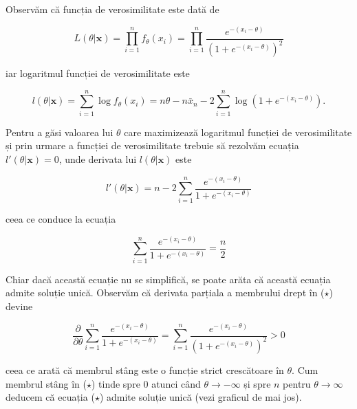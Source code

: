 \documentclass[
]{article}
\begin{document}
Observăm că funcția de verosimilitate este dată de

\[
L(\theta|\mathbf{x}) = \prod_{i=1}^{n}f_{\theta}(x_i) = \prod_{i=1}^{n}\frac{e^{-(x_i-\theta)}}{\left(1+e^{-(x_i-\theta)}\right)^2}
\]

iar logaritmul funcției de verosimilitate este

\[
l(\theta|\mathbf{x}) = \sum_{i=1}^{n}\log{f_{\theta}(x_i)} = n\theta - n\bar{x}_n - 2\sum_{i=1}^{n}\log{\left(1+e^{-(x_i-\theta)}\right)}.
\]

Pentru a găsi valoarea lui \(\theta\) care maximizează logaritmul
funcției de verosimilitate și prin urmare a funcției de verosimilitate
trebuie să rezolvăm ecuația \(l'(\theta|\mathbf{x}) = 0\), unde derivata
lui \(l(\theta|\mathbf{x})\) este

\[
l'(\theta|\mathbf{x}) = n - 2\sum_{i = 1}^{n}\frac{e^{-(x_i-\theta)}}{1+e^{-(x_i-\theta)}}
\]

ceea ce conduce la ecuația

\[
  \sum_{i = 1}^{n}\frac{e^{-(x_i-\theta)}}{1+e^{-(x_i-\theta)}} = \frac{n}{2} \tag{$\star$}
\]

Chiar dacă această ecuație nu se simplifică, se poate arăta că această
ecuația admite soluție unică. Observăm că derivata parțiala a membrului
drept în (\(\star\)) devine

\[
\frac{\partial }{\partial \theta}\sum_{i = 1}^{n}\frac{e^{-(x_i-\theta)}}{1+e^{-(x_i-\theta)}} = \sum_{i = 1}^{n}\frac{e^{-(x_i-\theta)}}{\left(1+e^{-(x_i-\theta)}\right)^2}>0
\]

ceea ce arată că membrul stâng este o funcție strict crescătoare în
\(\theta\). Cum membrul stâng în (\(\star\)) tinde spre \(0\) atunci
când \(\theta\to-\infty\) și spre \(n\) pentru \(\theta\to\infty\)
deducem că ecuația (\(\star\)) admite soluție unică (vezi graficul de
mai jos).
\end{document}
